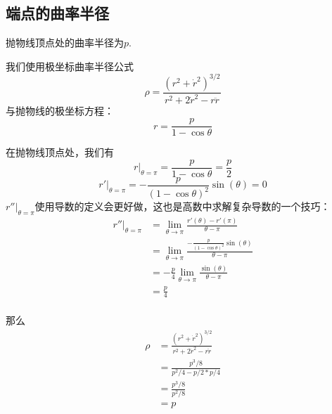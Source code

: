 \subsection{端点的曲率半径}
抛物线顶点处的曲率半径为$p$.

我们使用极坐标曲率半径公式
$$
\rho = \frac{(r^2 + \dot r^2)^{3/2}}{r^2 + 2\dot r^2 - r\ddot r}
$$
与抛物线的极坐标方程：
$$
r = \frac{p}{1 - \cos \theta }
$$

在抛物线顶点处，我们有
$$
r|_{\theta = \pi} = \frac{p}{1 - \cos \theta} = \frac{p}{2}
$$
$$
r' |_{\theta = \pi} = -\frac{p}{(1 - \cos \theta)^2} \sin(\theta) = 0
$$
$r'' |_{\theta = \pi}$使用导数的定义会更好做，这也是高数中求解复杂导数的一个技巧：
$$
\begin{aligned}
r''|_{\theta = \pi}  &= \lim_{\theta \to \pi} \frac{r'(\theta) - r'(\pi)}{\theta - \pi}\\
&=\lim_{\theta \to \pi} \frac{-\frac{p}{(1 - \cos \theta)^2} \sin(\theta)}{\theta - \pi}\\
&=-\frac{p}{4} \lim_{\theta \to \pi} \frac{\sin(\theta)}{\theta - \pi}\\
&=\frac{p}{4}\\
\end{aligned}
$$

那么
$$
\begin{aligned}
\rho &= \frac{(r^2 + \dot r^2)^{3/2}}{r^2 + 2\dot r^2 - r\ddot r}\\
&=\frac{p^3/8}{p^2/4 - p/2*p/4}\\
&=\frac{p^3/8}{p^2/8}\\
&=p\\
\end{aligned}
$$
